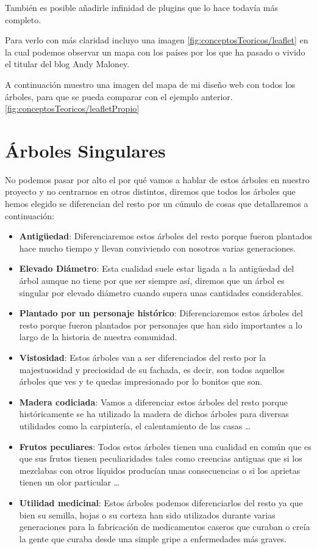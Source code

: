 También es posible añadirle infinidad de plugins que lo hace todavía más completo.

Para verlo con más claridad incluyo una imagen \ref{fig:conceptosTeoricos/leaflet} en la cual podemos observar un mapa con los países por los que ha pasado o vivido el titular del blog Andy Maloney.


A continuación muestro una imagen del mapa de mi diseño web con todos los árboles, para que se pueda comparar con el ejemplo anterior. \ref{fig:conceptosTeoricos/leafletPropio}

\newpage

\section{Árboles Singulares}

No podemos pasar por alto el por qué vamos a hablar de estos árboles en nuestro proyecto y no centrarnos en otros distintos, diremos que todos los árboles que hemos elegido se diferencian del resto por un cúmulo de cosas que detallaremos a continuación:

\begin{itemize}
	\item \textbf{Antigüedad}: Diferenciaremos estos árboles del resto porque fueron plantados hace mucho tiempo y llevan conviviendo con nosotros varias generaciones.  
	\item \textbf{Elevado Diámetro}: Esta cualidad suele estar ligada a la antigüedad del árbol aunque no tiene por que ser siempre así, diremos que un árbol es singular por elevado diámetro cuando supera unas cantidades considerables.
	\item \textbf{Plantado por un personaje histórico}: Diferenciaremos estos árboles del resto porque fueron plantados por personajes que han sido importantes a lo largo de la historia de nuestra comunidad.
	\item \textbf{Vistosidad}: Estos árboles van a ser diferenciados del resto por la majestuosidad y preciosidad de su fachada, es decir, son todos aquellos árboles que ves y te quedas impresionado por lo bonitos que son. 
	\item \textbf{Madera codiciada}: Vamos a diferenciar estos árboles del resto porque históricamente se ha utilizado la madera de dichos árboles para diversas utilidades como la carpintería, el calentamiento de las casas \ldots
	\item \textbf{Frutos peculiares}: Todos estos árboles tienen una cualidad en común que es que sus frutos tienen peculiaridades tales como creencias antiguas que si los mezclabas con otros líquidos producían unas consecuencias o si los aprietas tienen un olor particular \ldots
	\item \textbf{Utilidad medicinal}: Estos árboles podemos diferenciarlos del resto ya que bien su semilla, hojas o su corteza han sido utilizados durante varias generaciones para la fabricación de medicamentos caseros que curaban o creía la gente que curaba desde una simple gripe a enfermedades más graves.
\end{itemize}
